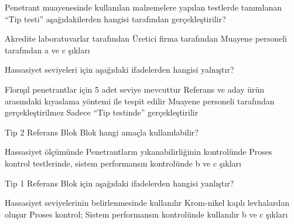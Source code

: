 \begin{question}[subtitle=]
  Penetrant muayenesinde kullanılan malzemelere yapılan testlerde tanımlanan ``Tip testi''
  aşağıdakilerden hangisi tarafından gerçekleştirilir?
	\begin{tasks}
          \task Akredite laboratuvarlar tarafından \correct
          \task Üretici firma tarafından
          \task Muayene personeli tarafından
          \task a ve c şıkları
	\end{tasks}
\end{question}
\begin{solution}
	\correct
\end{solution}

\begin{question}[subtitle=]
  Hassasiyet seviyeleri için aşağıdaki ifadelerden hangisi yalnıştır?
	\begin{tasks}
          \task Florışıl penetrantlar için 5 adet seviye mevcuttur
          \task Referans ve aday ürün arasındaki kıyaslama yöntemi ile tespit edilir
          \task Muayene personeli tarafından gerçekleştirilmez
          \task Sadece ``Tip testinde'' gerçekleştirilir \correct
	\end{tasks}
\end{question}
\begin{solution}
	\correct
\end{solution}

\begin{question}[subtitle=]
Tip 2 Referans Blok Blok hangi amaçla kullanılabilir?
	\begin{tasks}
          \task Hassasiyet ölçümünde
          \task Penetrantların yıkanabilirliğinin kontrolünde
          \task Proses kontrol testlerinde, sistem performansın kontrolünde
          \task b ve c şıkları \correct
	\end{tasks}
\end{question}
\begin{solution}
	\correct
\end{solution}

\begin{question}[subtitle=]
Tip 1 Referans Blok için aşağıdaki ifadelerden hangisi yanlıştır?
	\begin{tasks}
          \task Hassasiyet seviyelerinin belirlenmesinde kullanılır
          \task Krom-nikel kaplı levhalardan oluşur
          \task Proses kontrol; Sistem performansın kontrolünde kullanılır \correct
          \task b ve c şıkları
	\end{tasks}
\end{question}
\begin{solution}
	\correct
\end{solution}

